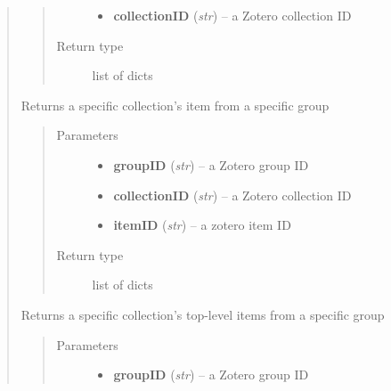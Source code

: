 \documentclass[letterpaper,10pt,english]{sphinxmanual}
\begin{document}
\begin{quote}
\begin{fulllineitems}
\begin{quote}
\begin{description}
\begin{itemize}
\item {} 
\textbf{collectionID} (\emph{str}) -- a Zotero collection ID

\end{itemize}

\item[{Return type}] \leavevmode
list of dicts

\end{description}\end{quote}

\end{fulllineitems}


\begin{fulllineitems}
\label{index:pyzotero.zotero.Zotero.group_collection_item}
Returns a specific collection's item from a specific group
\begin{quote}\begin{description}
\item[{Parameters}] \leavevmode\begin{itemize}
\item {} 
\textbf{groupID} (\emph{str}) -- a Zotero group ID

\item {} 
\textbf{collectionID} (\emph{str}) -- a Zotero collection ID

\item {} 
\textbf{itemID} (\emph{str}) -- a zotero item ID

\end{itemize}

\item[{Return type}] \leavevmode
list of dicts

\end{description}\end{quote}

\end{fulllineitems}


\begin{fulllineitems}
\label{index:pyzotero.zotero.Zotero.group_collection_top}
Returns a specific collection's top-level items from a specific group
\begin{quote}\begin{description}
\item[{Parameters}] \leavevmode\begin{itemize}
\item {} 
\textbf{groupID} (\emph{str}) -- a Zotero group ID


\end{itemize}
\end{description}
\end{quote}
\end{fulllineitems}
\end{quote}
\end{document}
